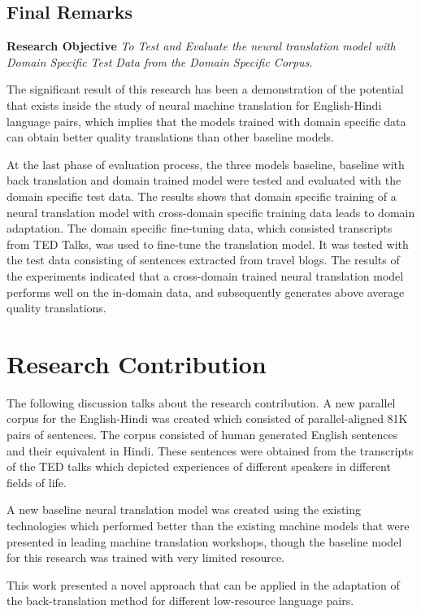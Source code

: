 \subsection{Final Remarks }
\textbf{Research Objective} \textit{To Test and Evaluate the neural translation model with Domain Specific Test Data from the Domain Specific Corpus.}

The significant result of this research has been a demonstration of the potential that exists inside the study of neural machine translation for English-Hindi language pairs, which implies that the models trained with domain specific data can obtain better quality translations than other baseline models.

At the last phase of evaluation process, the three models baseline, baseline with back translation and domain trained model were tested and evaluated with the domain specific test data. The results shows that domain specific training of a neural translation model with cross-domain specific training data leads to domain adaptation. The domain specific fine-tuning data, which consisted transcripts from TED Talks, was used to fine-tune the translation model. It was tested with the test data consisting of sentences extracted from travel blogs. The results of the experiments indicated that a cross-domain trained neural translation model performs well on the in-domain data, and subsequently generates above average quality translations. 

\section{Research Contribution}
The following discussion talks about the research contribution. A new parallel corpus for the English-Hindi was created  which consisted of parallel-aligned 81K pairs of sentences. The corpus consisted of human generated English sentences and their equivalent in Hindi. These sentences were obtained from the transcripts of the TED talks which depicted experiences of different speakers in different fields of life. 

A new baseline neural translation model was created using the existing technologies which performed better than the existing machine models that were presented in leading machine translation workshops, though the baseline model for this research was trained with very limited resource.

This work presented a novel approach that can be applied in the adaptation of the back-translation method for different low-resource language pairs. 

